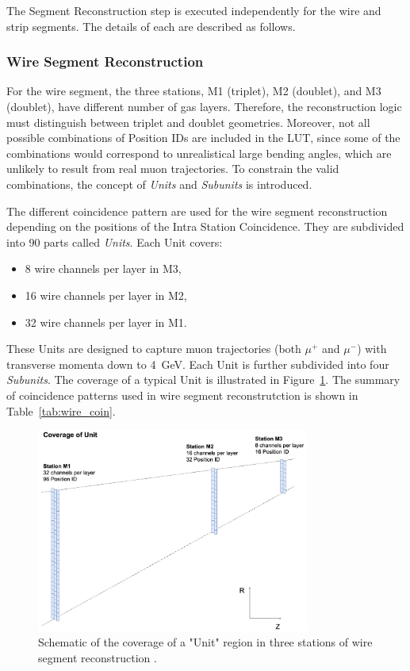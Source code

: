 The Segment Reconstruction step is executed independently for the wire and strip segments. The details of each are described as follows.

\subsubsection{Wire Segment Reconstruction}

For the wire segment, the three stations, M1 (triplet), M2 (doublet), and M3 (doublet), have different number of gas layers. Therefore, the reconstruction logic must distinguish between triplet and doublet geometries. Moreover, not all possible combinations of Position IDs are included in the LUT, since some of the combinations would correspond to unrealistical large bending angles, which are unlikely to result from real muon trajectories. To constrain the valid combinations, the concept of \textit{Units} and \textit{Subunits} is introduced.

The different coincidence pattern are used for the wire segment reconstruction depending on the positions of the Intra Station Coincidence. They are subdivided into 90 parts called \textit{Units}. Each Unit covers:
\begin{itemize}
  \item 8 wire channels per layer in M3,
  \item 16 wire channels per layer in M2,
  \item 32 wire channels per layer in M1.
\end{itemize}
These Units are designed to capture muon trajectories (both $\mu^+$ and $\mu^-$) with transverse momenta down to 4~GeV. Each Unit is further subdivided into four \textit{Subunits}. The coverage of a typical Unit is illustrated in Figure~\ref{fig:wire_unit}. The summary of coincidence patterns used in wire segment reconstrutction is shown in Table~\ref{tab:wire_coin}.


\begin{figure}[htbp]
  \centering
  \includegraphics[width=0.8\textwidth]{figs/chapter5/wire_unit.png}
  \caption{Schematic of the coverage of a "Unit" region in three stations of wire segment reconstruction \cite{EndcapSLPDR}.}
  \label{fig:wire_unit}
\end{figure}

